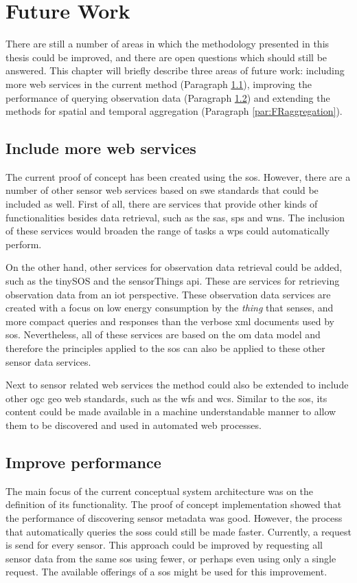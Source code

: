 
\chapter{Future Work}
\label{chap:futureResearch}

There are still a number of areas in which the methodology presented in this thesis could be improved, and there are open questions which should still be answered. This chapter will briefly describe three areas of future work: including more web services in the current method (Paragraph \ref{more}), improving the performance of querying observation data (Paragraph \ref{faster}) and extending the methods for spatial and temporal aggregation (Paragraph \ref{par:FRaggregation}). 

\section{Include more web services}
\label{more}
The current proof of concept has been created using the \ac{sos}. However, there are a number of other sensor web services based on \ac{swe} standards that could be included as well. First of all, there are services that provide other kinds of functionalities besides data retrieval, such as the \acf{sas}, \acf{sps} and \acf{wns}. The inclusion of these services would broaden the range of tasks a \ac{wps} could automatically perform. 

On the other hand, other services for observation data retrieval could be added, such as the tinySOS and the sensorThings \ac{api}. These are services for retrieving observation data from an \ac{iot} perspective. These observation data services are created with a focus on low energy consumption by the \textit{thing} that senses, and more compact queries and responses than the verbose \ac{xml} documents used by \ac{sos}. Nevertheless, all of these services are based on the \ac{om} data model and therefore the principles applied to the \ac{sos} can also be applied to these other sensor data services.  

Next to sensor related web services the method could also be extended to include other \ac{ogc} geo web standards, such as the \acf{wfs} and \acf{wcs}. Similar to the \ac{sos}, its content could be made available in a machine understandable manner to allow them to be discovered and used in automated web processes.    

\section{Improve performance}
\label{faster}
The main focus of the current conceptual system architecture was on the definition of its functionality. The proof of concept implementation showed that the performance of discovering sensor metadata was good. However, the process that automatically queries the \aclp{sos} could still be made faster. Currently, a request is send for every sensor. This approach could be improved by requesting all sensor data from the same \ac{sos} using fewer, or perhaps even using only a single request. The available offerings of a \ac{sos} might be used for this improvement.      

